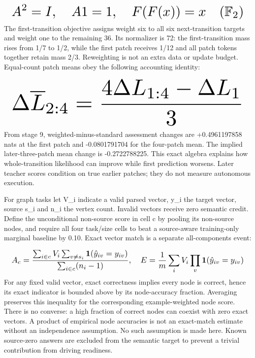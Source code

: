 \documentclass[10pt,letterpaper,twocolumn]{article}
\begin{document}
\begin{equation}
\resizebox{.98\columnwidth}{!}{$\displaystyle A^2=I,\quad A1=1,\quad F(F(x))=x\quad (\mathbb{F}_2)$}
\end{equation}
The first-transition objective assigns weight six to all six next-transition targets and weight one to the remaining 36. Its normalizer is 72: the first-transition mass rises from 1/\allowbreak{}7 to 1/\allowbreak{}2, while the first patch receives 1/\allowbreak{}12 and all patch tokens together retain mass 2/\allowbreak{}3. Reweighting is not an extra data or update budget. Equal-count patch means obey the following accounting identity:

\begin{equation}
\resizebox{.98\columnwidth}{!}{$\displaystyle \Delta\overline L_{2:4}={4\Delta L_{1:4}-\Delta L_1\over3}$}
\end{equation}
From stage 9, weighted-minus-standard assessment changes are +0.4961197858 nats at the first patch and -0.0801791704 for the four-patch mean. The implied later-three-patch mean change is -0.2722788225. This exact algebra explains how whole-transition likelihood can improve while first prediction worsens. Later teacher scores condition on true earlier patches; they do not measure autonomous execution.

For graph tasks let V\_\allowbreak{}i indicate a valid parsed vector, y\_\allowbreak{}i the target vector, source s\_\allowbreak{}i and n\_\allowbreak{}i the vertex count. Invalid vectors receive zero semantic credit. Define the unconditional non-source score in cell c by pooling its non-source nodes, and require all four task/\allowbreak{}size cells to beat a source-aware training-only marginal baseline by 0.10. Exact vector match is a separate all-components event:

\begin{equation}
\resizebox{.98\columnwidth}{!}{$\displaystyle A_c={\sum_{i\in c}V_i\sum_{v\ne s_i}{\bf1}(\hat y_{iv}=y_{iv})\over\sum_{i\in c}(n_i-1)},\quad E={1\over m}\sum_i V_i\prod_v{\bf1}(\hat y_{iv}=y_{iv})$}
\end{equation}
For any fixed valid vector, exact correctness implies every node is correct, hence its exact indicator is bounded above by its node-accuracy fraction. Averaging preserves this inequality for the corresponding example-weighted node score. There is no converse: a high fraction of correct nodes can coexist with zero exact vectors. A product of empirical node accuracies is not an exact-match estimate without an independence assumption. No such assumption is made here. Known source-zero answers are excluded from the semantic target to prevent a trivial contribution from driving readiness.
\end{document}
